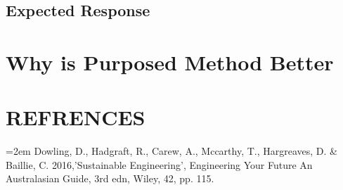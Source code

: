 \documentclass{article}
\begin{document}
\subsection{Expected Response}\label{sec:EXPECTED}


        
\section{Why is Purposed Method Better}\label{conclusion}
\pagebreak
\section{REFRENCES}\label{refrences}
\begin{flushleft}

\hangindent=2em
Dowling, D., Hadgraft, R., Carew, A., Mccarthy, T., Hargreaves, D. \& Baillie, C. 2016,'Sustainable Engineering', Engineering Your Future An Australasian Guide, 3rd edn, Wiley, 42, pp. 115.\linebreak



\pagebreak
\end{flushleft}
\end{document}

